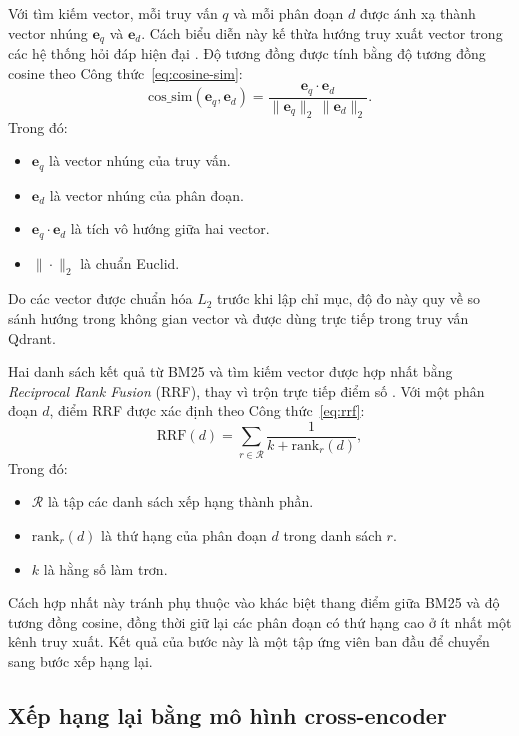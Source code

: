 \documentclass[../DoAn.tex]{subfiles}
\begin{document}
Với tìm kiếm vector, mỗi truy vấn $q$ và mỗi phân đoạn $d$ được ánh xạ thành vector nhúng $\mathbf{e}_q$ và $\mathbf{e}_d$. Cách biểu diễn này kế thừa hướng truy xuất vector trong các hệ thống hỏi đáp hiện đại \cite{karpukhin2020dpr,reimers2019sbert}. Độ tương đồng được tính bằng độ tương đồng cosine theo Công thức~\ref{eq:cosine-sim}:
\begin{equation}
\mathrm{cos\_sim}(\mathbf{e}_q,\mathbf{e}_d)
=
\frac{\mathbf{e}_q \cdot \mathbf{e}_d}
{\|\mathbf{e}_q\|_2\,\|\mathbf{e}_d\|_2}.
\label{eq:cosine-sim}
\end{equation}
Trong đó:\\
\begin{itemize}
\item $\mathbf{e}_q$ là vector nhúng của truy vấn.
\item $\mathbf{e}_d$ là vector nhúng của phân đoạn.
\item $\mathbf{e}_q \cdot \mathbf{e}_d$ là tích vô hướng giữa hai vector.
\item $\|\cdot\|_2$ là chuẩn Euclid.
\end{itemize}
Do các vector được chuẩn hóa $L_2$ trước khi lập chỉ mục, độ đo này quy về so sánh hướng trong không gian vector và được dùng trực tiếp trong truy vấn Qdrant.

Hai danh sách kết quả từ BM25 và tìm kiếm vector được hợp nhất bằng \textit{Reciprocal Rank Fusion} (RRF), thay vì trộn trực tiếp điểm số \cite{cormack2009rrf}. Với một phân đoạn $d$, điểm RRF được xác định theo Công thức~\ref{eq:rrf}:
\begin{equation}
\mathrm{RRF}(d)=\sum_{r \in \mathcal{R}} \frac{1}{k+\mathrm{rank}_r(d)},
\label{eq:rrf}
\end{equation}
Trong đó:\\
\begin{itemize}
\item $\mathcal{R}$ là tập các danh sách xếp hạng thành phần.
\item $\mathrm{rank}_r(d)$ là thứ hạng của phân đoạn $d$ trong danh sách $r$.
\item $k$ là hằng số làm trơn.
\end{itemize}
Cách hợp nhất này tránh phụ thuộc vào khác biệt thang điểm giữa BM25 và độ tương đồng cosine, đồng thời giữ lại các phân đoạn có thứ hạng cao ở ít nhất một kênh truy xuất. Kết quả của bước này là một tập ứng viên ban đầu để chuyển sang bước xếp hạng lại.

\subsection{Xếp hạng lại bằng mô hình cross-encoder}
\end{document}
